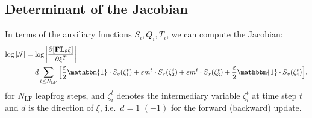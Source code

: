 \documentclass[../main.tex]{subfiles}
\begin{document}
\subsection{Determinant of the Jacobian}
In terms of the auxiliary functions $S_{i}, Q_{i}, T_{i}$, we can compute the Jacobian:
%
\begin{align}
  \log|\mathcal{J}| 
  &= \log\bigg|\frac{\partial{\left[\mathbf{FL}_{\theta}\xi\right]}}{\partial \xi^{T}}\bigg|\\
  &= d \sum_{t\leq N_{\mathrm{LF}}}
    {\left[\frac{\eps}{2} \mathbbm{1}\cdot S_{v}(\zeta_{1}^{t}) + \eps m^{t} \cdot S_{x}(\zeta_{2}^{t}) 
      + \eps \bar{m}^{t} \cdot S_{x}(\zeta_{3}^{t}) + \frac{\eps}{2}\mathbbm{1} \cdot S_{v}(\zeta_{4}^{t})\right]}.
\end{align}
%
for $N_{\mathrm{LF}}$ leapfrog steps, and $\zeta_{i}^{t}$ denotes the intermediary variable $\zeta_{i}^{t}$ at time
step $t$ and $d$ is the direction of $\xi$, i.e.\ $d = 1 \,\, (-1)$ for the forward (backward) update.
%
\end{document}
